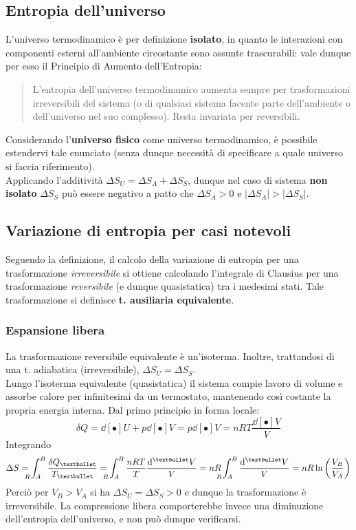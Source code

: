 \documentclass[10pt, oneside]{book}
\newcommand{\clausius}[2]{\frac{\delta Q_{#1}}{T_{#2}}}
\newcommand{\ds}{\displaystyle}
\begin{document}
\subsection{Entropia dell'universo}
L'universo termodinamico è per definizione \textbf{isolato}, in quanto le interazioni con componenti esterni all'ambiente circostante sono assunte trascurabili: vale dunque per esso il Principio di Aumento dell'Entropia:
\begin{quote}
L'entropia dell'universo termodinamico aumenta sempre per trasformazioni irreversibili del sistema (o di qualsiasi sistema facente parte dell'ambiente o dell'universo nel suo complesso). Resta invariata per reversibili.
\end{quote}
Considerando l'\textbf{universo fisico} come universo termodinamico, è possibile estendervi tale enunciato (senza dunque necessità di specificare a quale universo si faccia riferimento).\\
Applicando l'additività $\ds \Delta S_U = \Delta S_A + \Delta S_S$, dunque nel caso di sistema \textbf{non isolato} $\Delta S_S$ può essere negativo a patto che $\Delta S_A > 0$ e $|\Delta S_A| > |\Delta S_S|$.

\subsection{Variazione di entropia per casi notevoli}
Seguendo la definizione, il calcolo della variazione di entropia per una trasformazione \textit{irreversibile} si ottiene calcolando l'integrale di Clausius per una trasformazione \textit{reversibile} (e dunque quasistatica) tra i medesimi stati. Tale trasformazione si definisce \textbf{t. ausiliaria equivalente}.

\subsubsection{Espansione libera}
La trasformazione reversibile equivalente è un'isoterma. Inoltre, trattandosi di una t. adiabatica (irreversibile), $\Delta S_U = \Delta S_S$.\\
Lungo l'isoterma equivalente (quasistatica) il sistema compie lavoro di volume e assorbe calore per infinitesimi da un termostato, mantenendo così costante la propria energia interna. Dal primo principio in forma locale:
\[\delta Q = \dd[•]{U} + p \dd[•]{V} = p \dd[•]{V} = nR T \frac{\dd[•]{V}}{V}\]
Integrando
\[\Delta S = \int_{\hspace{-0.45cm} R \hspace{0.22cm} A}^B \clausius{•}{•} = \int_{\hspace{-0.45cm} R \hspace{0.22cm} A}^B \frac{nRT}{T} \frac{\dd[•]{V}}{V} = nR \int_{\hspace{-0.45cm} R \hspace{0.22cm} A}^B \frac{\dd[•]{V}}{V} = nR \ln \bigg( \frac{V_B}{V_A} \bigg)\]
Perciò per $V_B > V_A$ si ha $\Delta S_U = \Delta S_S > 0$ e dunque la trasformazione è irreversibile. La compressione libera comporterebbe invece una diminuzione dell'entropia dell'universo, e non può dunque verificarsi.\\
\end{document}
